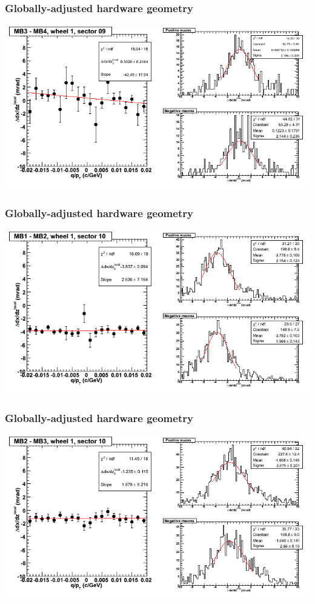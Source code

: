 \documentclass[compress]{beamer}
\begin{document}
\begin{frame}
\frametitle{Globally-adjusted hardware geometry}
\includegraphics[width=\linewidth]{NOV4_segdiffs_HW/dt13_slope_D_09_34.png}
\end{frame}

\begin{frame}
\frametitle{Globally-adjusted hardware geometry}
\includegraphics[width=\linewidth]{NOV4_segdiffs_HW/dt13_slope_D_10_12.png}
\end{frame}

\begin{frame}
\frametitle{Globally-adjusted hardware geometry}
\includegraphics[width=\linewidth]{NOV4_segdiffs_HW/dt13_slope_D_10_23.png}
\end{frame}
\end{document}
